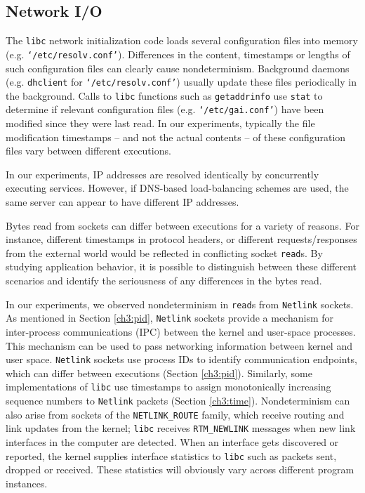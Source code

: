 \subsection{Network I/O} \label{ch3:netio}
 \newline
The \texttt{libc} network initialization
code loads several configuration files
into memory (e.g. \texttt{`/etc/resolv.conf'}). 
Differences in the content, timestamps or lengths
of such configuration files can clearly cause nondeterminism.
Background daemons (e.g. \texttt{dhclient} for \texttt{`/etc/resolv.conf'}) 
usually update these files periodically in the background.
Calls to \texttt{libc} functions such as \texttt{getaddrinfo} use \texttt{stat} 
to determine if relevant configuration files (e.g. \texttt{`/etc/gai.conf'})
have been modified since they were last read. 
In our experiments, typically the file modification timestamps 
-- and not the actual contents -- of these configuration files 
vary between different executions. \newline

 \newline
In our experiments, IP addresses are resolved identically by concurrently executing services. 
However, if DNS-based load-balancing schemes are used, the same 
server can appear to have different IP addresses. \newline

 \newline
Bytes read from sockets can differ between
executions for a variety
of reasons. For instance, different timestamps in 
protocol headers, or different requests/responses 
from the external world would be reflected in
conflicting socket \texttt{read}s.
By studying application behavior, it is possible
to distinguish between 
these different scenarios and
identify the seriousness
of any differences in the bytes read.

In our experiments, we observed nondeterminism
in \texttt{read}s from \texttt{Netlink} sockets.
As mentioned in Section \ref{ch3:pid},
\texttt{Netlink} sockets provide a 
mechanism for inter-process communications (IPC)
between the kernel and user-space processes.
This mechanism can be used to pass
networking information between kernel
and user space. \texttt{Netlink} sockets
use process IDs to identify
communication endpoints, which can 
differ between executions (Section \ref{ch3:pid}).
Similarly, some implementations of \texttt{libc} use
timestamps to assign monotonically increasing sequence 
numbers to \texttt{Netlink} packets (Section \ref{ch3:time}).
Nondeterminism can also arise from sockets of the \texttt{NETLINK\_ROUTE}
family, which receive routing and link updates
from the kernel; \texttt{libc} receives \texttt{RTM\_NEWLINK}
messages when new link interfaces 
in the computer are detected. When an interface
gets discovered or reported, the kernel supplies
interface statistics to \texttt{libc} 
such as packets sent, dropped or
received. These statistics will obviously vary
across different program instances.  
\newline

